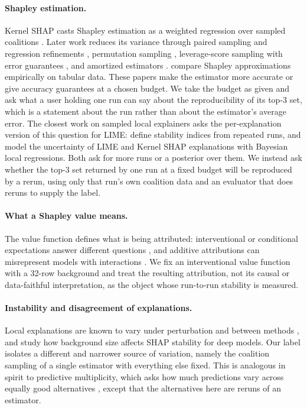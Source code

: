 \documentclass{article}
\begin{document}
\paragraph{Shapley estimation.}
Kernel SHAP casts Shapley estimation as a weighted regression over sampled coalitions \citep{Lundberg2017Unified}. Later work reduces its variance through paired sampling and regression refinements \citep{Covert2020Improving}, permutation sampling \citep{Mitchell2021Sampling}, leverage-score sampling with error guarantees \citep{Musco2024Provably}, and amortized estimators \citep{Jethani2021FastSHAP}. \citet{Gupte2025Understanding} compare Shapley approximations empirically on tabular data. These papers make the estimator more accurate or give accuracy guarantees at a chosen budget. We take the budget as given and ask what a user holding one run can say about the reproducibility of its top-3 set, which is a statement about the run rather than about the estimator's average error. The closest work on sampled local explainers asks the per-explanation version of this question for LIME: \citet{Visani2021Statistical} define stability indices from repeated runs, and \citet{Slack2020Reliable} model the uncertainty of LIME and Kernel SHAP explanations with Bayesian local regressions. Both ask for more runs or a posterior over them. We instead ask whether the top-3 set returned by one run at a fixed budget will be reproduced by a rerun, using only that run's own coalition data and an evaluator that does reruns to supply the label.

\paragraph{What a Shapley value means.}
The value function defines what is being attributed: interventional or conditional expectations answer different questions \citep{Sundararajan2019many,Chen2020True,Frye2020Shapley,Kumar2020Problems,Covert2020Explaining}, and additive attributions can misrepresent models with interactions \citep{Gosiewska2019Do}. We fix an interventional value function with a 32-row background and treat the resulting attribution, not its causal or data-faithful interpretation, as the object whose run-to-run stability is measured.

\paragraph{Instability and disagreement of explanations.}
Local explanations are known to vary under perturbation and between methods \citep{Ribeiro2016Why,AlvarezMelis2018Robustness,Krishna2022Disagreement}, and \citet{Yuan2022empirical} study how background size affects SHAP stability for deep models. Our label isolates a different and narrower source of variation, namely the coalition sampling of a single estimator with everything else fixed. This is analogous in spirit to predictive multiplicity, which asks how much predictions vary across equally good alternatives \citep{Marx2019Predictive}, except that the alternatives here are reruns of an estimator.
\end{document}
